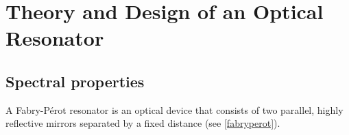 \documentclass[../Thesis-IJspeert.tex]{subfiles}
\begin{document}
\graphicspath{ {"Theory and Design of an Optical Resonator/figs/"} }

\chapter{Theory and Design of an Optical Resonator}
\label{chap:TheoryandDesignofanOpticalResonator}

\section{Spectral properties}
A Fabry-Pérot resonator is an optical device that consists of two parallel, highly reflective mirrors separated by a fixed distance (see \autoref{fabryperot}).
\end{document}
